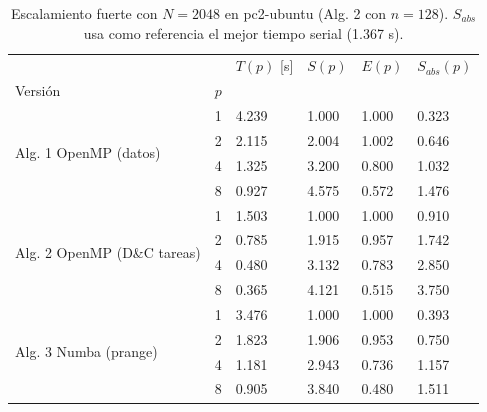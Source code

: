 \begin{table}[H]
\centering\small
\caption{Escalamiento fuerte con $N=2048$ en pc2-ubuntu (Alg. 2 con $n=128$). $S_{abs}$ usa como referencia el mejor tiempo serial (1.367 s).}
\label{tab:bcd_escalamiento_pc2-ubuntu}
\begin{tabular}{llllll}
\toprule
 &  & $T(p)$ [s] & $S(p)$ & $E(p)$ & $S_{abs}(p)$ \\
Versión & $p$ &  &  &  &  \\
\midrule
\multirow[t]{4}{*}{Alg. 1 OpenMP (datos)} & 1 & 4.239 & 1.000 & 1.000 & 0.323 \\
 & 2 & 2.115 & 2.004 & 1.002 & 0.646 \\
 & 4 & 1.325 & 3.200 & 0.800 & 1.032 \\
 & 8 & 0.927 & 4.575 & 0.572 & 1.476 \\
\cline{1-6}
\multirow[t]{4}{*}{Alg. 2 OpenMP (D\&C tareas)} & 1 & 1.503 & 1.000 & 1.000 & 0.910 \\
 & 2 & 0.785 & 1.915 & 0.957 & 1.742 \\
 & 4 & 0.480 & 3.132 & 0.783 & 2.850 \\
 & 8 & 0.365 & 4.121 & 0.515 & 3.750 \\
\cline{1-6}
\multirow[t]{4}{*}{Alg. 3 Numba (prange)} & 1 & 3.476 & 1.000 & 1.000 & 0.393 \\
 & 2 & 1.823 & 1.906 & 0.953 & 0.750 \\
 & 4 & 1.181 & 2.943 & 0.736 & 1.157 \\
 & 8 & 0.905 & 3.840 & 0.480 & 1.511 \\
\cline{1-6}
\bottomrule
\end{tabular}
\end{table}
